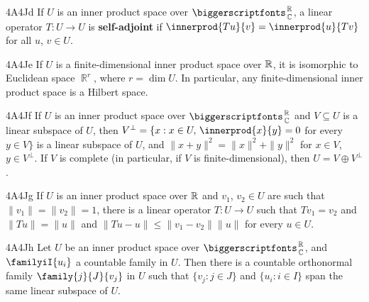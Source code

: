 \spheader 4A4Jd If $U$ is an inner product space over $\RoverC$, a
linear operator $T:U\to U$ is {\bf self-adjoint} if
$\innerprod{Tu}{v}=\innerprod{u}{Tv}$ for all $u$, $v\in U$.

\spheader 4A4Je If $U$ is a finite-dimensional inner product space over
$\Bbb R$, it
is isomorphic to Euclidean space $\BbbR^r$, where $r=\dim U$.
   In particular, any
finite-dimensional inner product space is a Hilbert space.

\spheader 4A4Jf If $U$ is an inner product space over $\RoverC$ and
$V\subseteq U$ is a linear subspace of $U$, then
$V^{\perp}=\{x:x\in U,\,\innerprod{x}{y}=0$ for every $y\in V\}$ is a
linear subspace of $U$, and $\|x+y\|^2=\|x\|^2+\|y\|^2$ for $x\in V$,
$y\in V^{\perp}$.   If $V$ is complete (in particular, if $V$ is
finite-dimensional), then $U=V\oplus V^{\perp}$.   

\spheader 4A4Jg If $U$ is an inner product space over $\Bbb R$ and
$v_1$, $v_2\in U$ are such
that $\|v_1\|=\|v_2\|=1$, there is a linear operator $T:U\to U$ such
that $Tv_1=v_2$ and $\|Tu\|=\|u\|$ and $\|Tu-u\|\le\|v_1-v_2\|\|u\|$ for
every $u\in U$.   

\spheader 4A4Jh Let $U$ be an inner product space over $\RoverC$, and
$\familyiI{u_i}$
a countable family in $U$.   Then there is a countable orthonormal
family $\family{j}{J}{v_j}$ in $U$ such that $\{v_j:j\in J\}$ and
$\{u_i:i\in I\}$ span the same linear subspace of $U$.

